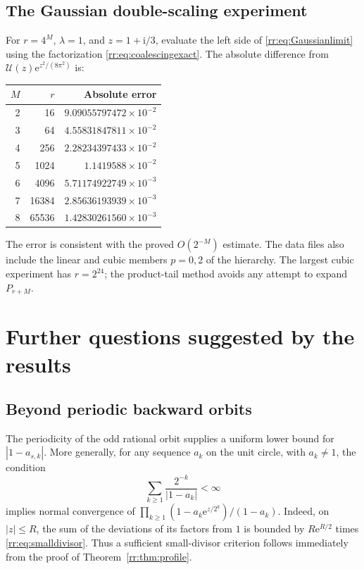 \documentclass[11pt,a4paper,oneside,openany]{book}
\numberwithin{equation}{chapter}
\theoremstyle{definition}
\theoremstyle{remark}
\newcommand{\e}{\mathrm e}
\newcommand{\ii}{\mathrm i}
\newcommand{\Up}{\mathcal U}
\begin{document}
\section{The Gaussian double-scaling experiment}
For \(r=4^M\), \(\lambda=1\), and \(z=1+\ii/3\), evaluate the left side of \eqref{rr:eq:Gaussianlimit} using the factorization \eqref{rr:eq:coalescingexact}. The absolute difference from \(\Up(z)\e^{z^2/(8\pi^2)}\) is:
\begin{center}
\begin{tabular}{rrr}
\toprule
\(M\)&\(r\)&Absolute error\\
\midrule
2&16&\(9.09055797472\times10^{-2}\)\\
3&64&\(4.55831847811\times10^{-2}\)\\
4&256&\(2.28234397433\times10^{-2}\)\\
5&1024&\(1.1419588\times10^{-2}\)\\
6&4096&\(5.71174922749\times10^{-3}\)\\
7&16384&\(2.85636193939\times10^{-3}\)\\
8&65536&\(1.42830261560\times10^{-3}\)\\
\bottomrule
\end{tabular}
\end{center}
The error is consistent with the proved \(O(2^{-M})\) estimate. The data files also include the linear and cubic members \(p=0,2\) of the hierarchy. The largest cubic experiment has \(r=2^{24}\); the product-tail method avoids any attempt to expand \(P_{r+M}\).
\chapter{Further questions suggested by the results}
\label{rr:sec:questions}

\section{Beyond periodic backward orbits}
The periodicity of the odd rational orbit supplies a uniform lower bound for \(|1-a_{s,k}|\). More generally, for any sequence \(a_k\) on the unit circle, with \(a_k\ne1\), the condition
\begin{equation}
 \sum_{k\geq1}\frac{2^{-k}}{|1-a_k|}<\infty
 \label{rr:eq:smalldivisor}
\end{equation}
implies normal convergence of
\(\prod_{k\geq1}(1-a_k\e^{z/2^k})/(1-a_k)\).
Indeed, on \(|z|\leq R\), the sum of the deviations of its factors from \(1\) is bounded by \(R\e^{R/2}\) times \eqref{rr:eq:smalldivisor}. Thus a sufficient small-divisor criterion follows immediately from the proof of Theorem~\ref{rr:thm:profile}.
\end{document}
